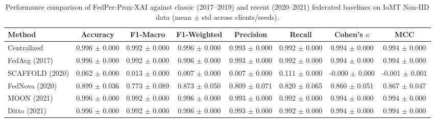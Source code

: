 \begin{table}[t]
\centering
\caption{Performance comparison of FedPer-Prox-XAI against classic (2017--2019) and recent (2020--2021) federated baselines on IoMT Non-IID data (mean $\pm$ std across clients/seeds).}
\label{tab:sota_comparison}
\begin{tabular}{lccccccc}
\toprule
Method & Accuracy & F1-Macro & F1-Weighted & Precision & Recall & Cohen's $\kappa$ & MCC \\
\midrule
Centralized & 0.996 $\pm$ 0.000 & 0.992 $\pm$ 0.000 & 0.996 $\pm$ 0.000 & 0.993 $\pm$ 0.000 & 0.992 $\pm$ 0.000 & 0.994 $\pm$ 0.000 & 0.994 $\pm$ 0.000 \\
FedAvg (2017) & 0.996 $\pm$ 0.000 & 0.992 $\pm$ 0.000 & 0.996 $\pm$ 0.000 & 0.993 $\pm$ 0.000 & 0.992 $\pm$ 0.000 & 0.994 $\pm$ 0.000 & 0.994 $\pm$ 0.000 \\
SCAFFOLD (2020) & 0.062 $\pm$ 0.000 & 0.013 $\pm$ 0.000 & 0.007 $\pm$ 0.000 & 0.007 $\pm$ 0.000 & 0.111 $\pm$ 0.000 & -0.000 $\pm$ 0.000 & -0.001 $\pm$ 0.001 \\
FedNova (2020) & 0.899 $\pm$ 0.036 & 0.773 $\pm$ 0.089 & 0.873 $\pm$ 0.050 & 0.809 $\pm$ 0.071 & 0.820 $\pm$ 0.065 & 0.860 $\pm$ 0.051 & 0.867 $\pm$ 0.047 \\
MOON (2021) & 0.996 $\pm$ 0.000 & 0.992 $\pm$ 0.000 & 0.996 $\pm$ 0.000 & 0.993 $\pm$ 0.000 & 0.992 $\pm$ 0.000 & 0.994 $\pm$ 0.000 & 0.994 $\pm$ 0.000 \\
Ditto (2021) & 0.996 $\pm$ 0.000 & 0.992 $\pm$ 0.000 & 0.996 $\pm$ 0.000 & 0.993 $\pm$ 0.000 & 0.992 $\pm$ 0.000 & 0.994 $\pm$ 0.000 & 0.994 $\pm$ 0.000 \\
\bottomrule
\end{tabular}
\end{table}
